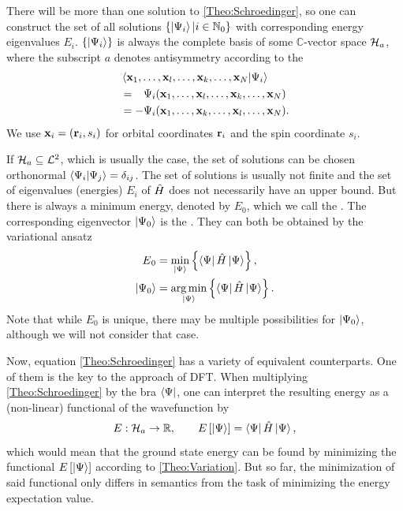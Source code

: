 There will be more than one solution to \eqref{Theo:Schroedinger}, so one can
construct the set of all solutions $\left\{{\left|\Psi{_i}\right\rangle | i \in \mathbb{N}_0} \right\}$ with
corresponding energy eigenvalues $E_i$. $\left\{{\left|\Psi{_i}\right\rangle} \right\}$ is always the complete
basis of some $\mathbb C$-vector space $\mathcal H_a$, where the subscript $a$ denotes
antisymmetry according to the 
\begin{equation}
\begin{aligned}
 &\bkt{\x_1,\ldots,\x_l,\ldots,\x_k,\ldots,\x_N | \Psi_i } \\
 &=\ph - \Psi_i(\x_1,\ldots,\x_l,\ldots,\x_k,\ldots,\x_N) \\
 &= - \Psi_i(\x_1,\ldots,\x_k,\ldots,\x_l,\ldots,\x_N).
\end{aligned}
\label{Theo:Pauli}
\end{equation}
We use $\mathbf{x}_i=(\mathbf{r}_i,s_i)$ for orbital coordinates $\mathbf{r}_i$ and the spin coordinate $s_i$.

 If $\mathcal H_a \subseteq \mathcal {L}^2$, which is usually the case,
the set of solutions can be chosen orthonormal $\left\langle{\Psi_i | \Psi_j}\right\rangle = \delta_{ij}$.
The set of solutions is usually not finite and the set of eigenvalues (energies) $E_i$ of $\hat{H}$
does not necessarily have an upper bound. But there is always a minimum energy,
denoted by $E_0$, which we call the . The corresponding eigenvector 
$\left|\Psi{_0}\right\rangle$ is the . They can both be obtained by the
variational ansatz
\begin{equation}
\begin{aligned}
 E{_0}&= \min_{\left|\Psi{}\right\rangle} \left\{{ \left\langle\Psi{}\right| \hat{H} \left|\Psi{}\right\rangle} \right\}, \\
 \left|\Psi{_0}\right\rangle&= \operatorname*{arg\,min}_{\left|\Psi{}\right\rangle} \left\{{ \left\langle\Psi{}\right| \hat{H} \left|\Psi{}\right\rangle} \right\}.
\end{aligned}
\label{Theo:Variation}
\end{equation}
Note that while $E_0$ is unique, there may be multiple possibilities for $\left|\Psi{_0}\right\rangle$, although
we will not consider that case.

Now, equation \eqref{Theo:Schroedinger} has a variety of equivalent counterparts. One of them
is the key to the approach of DFT. When multiplying \eqref{Theo:Schroedinger} by the bra $\left\langle\Psi{}\right|$,
one can interpret the resulting energy as a (non-linear) functional of the wavefunction by
\begin{equation}
 E : \mathcal H_a \rightarrow \mathbb{R}, \qquad E\left[{\left|\Psi{}\right\rangle}\right]=\left\langle\Psi{}\right| \hat{H} \left|\Psi{}\right\rangle,
 \label{Theo:WaveFunctional}
\end{equation}
which would mean that the ground state energy can be found by minimizing the functional
$E\left[{\left|\Psi{}\right\rangle}\right]$ according to \eqref{Theo:Variation}. But so far, the minimization
of said functional only differs in semantics from the task of minimizing the energy expectation value.

